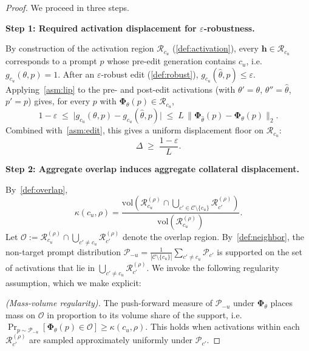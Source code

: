 \begin{proof}
We proceed in three steps.

\medskip
\noindent\textbf{Step 1: Required activation displacement for $\varepsilon$-robustness.}

By construction of the activation region $\mathcal{R}_{c_u}$ (\cref{def:activation}), every $\mathbf{h}\in\mathcal{R}_{c_u}$ corresponds to a prompt $p$ whose pre-edit generation contains $c_u$, i.e.\ $g_{c_u}(\theta,p)=1$. After an $\varepsilon$-robust edit (\cref{def:robust}), $g_{c_u}(\hat\theta,p)\le\varepsilon$. Applying~\cref{asm:lip} to the pre- and post-edit activations (with $\theta'=\theta$, $\theta''=\hat\theta$, $p'=p$) gives, for every $p$ with $\boldsymbol{\Phi}_\theta(p)\in\mathcal{R}_{c_u}$,
\begin{equation}
    1 - \varepsilon \;\le\; \bigl|g_{c_u}(\theta,p) - g_{c_u}(\hat\theta,p)\bigr|
    \;\le\; L\,\|\boldsymbol{\Phi}_{\hat\theta}(p)-\boldsymbol{\Phi}_\theta(p)\|_2.
\end{equation}
Combined with~\cref{asm:edit}, this gives a uniform displacement floor on $\mathcal{R}_{c_u}$:
\begin{equation}
\label{eq:proof_delta_floor}
    \Delta \;\geq\; \frac{1-\varepsilon}{L}.
\end{equation}

\medskip
\noindent\textbf{Step 2: Aggregate overlap induces aggregate collateral displacement.}

By~\cref{def:overlap},
\begin{equation}
    \kappa(c_u,\rho)
    =
    \frac{
        \mathrm{vol}\!\left(
        \mathcal{R}_{c_u}^{(\rho)}
        \cap
        \bigcup_{c'\in\mathcal{C}\setminus\{c_u\}}
        \mathcal{R}_{c'}^{(\rho)}
        \right)
    }{
        \mathrm{vol}\!\left(
        \mathcal{R}_{c_u}^{(\rho)}
        \right)
    } .
\end{equation}
Let $\mathcal{O} := \mathcal{R}_{c_u}^{(\rho)} \cap \bigcup_{c'\neq c_u}\mathcal{R}_{c'}^{(\rho)}$ denote the overlap region. By~\cref{def:neighbor}, the non-target prompt distribution $\mathcal{P}_{-u} = \tfrac{1}{|\mathcal{C}\setminus\{c_u\}|}\sum_{c'\neq c_u}\mathcal{P}_{c'}$ is supported on the set of activations that lie in $\bigcup_{c'\neq c_u}\mathcal{R}_{c'}^{(\rho)}$. We invoke the following regularity assumption, which we make explicit:

\smallskip
\noindent\emph{(Mass-volume regularity).} The push-forward measure of $\mathcal{P}_{-u}$ under $\boldsymbol{\Phi}_\theta$ places mass on $\mathcal{O}$ in proportion to its volume share of the support, i.e.\ $\Pr_{p\sim\mathcal{P}_{-u}}[\boldsymbol{\Phi}_\theta(p) \in \mathcal{O}] \geq \kappa(c_u,\rho)$. This holds when activations within each $\mathcal{R}_{c'}^{(\rho)}$ are sampled approximately uniformly under $\mathcal{P}_{c'}$.
\smallskip


\end{proof}
